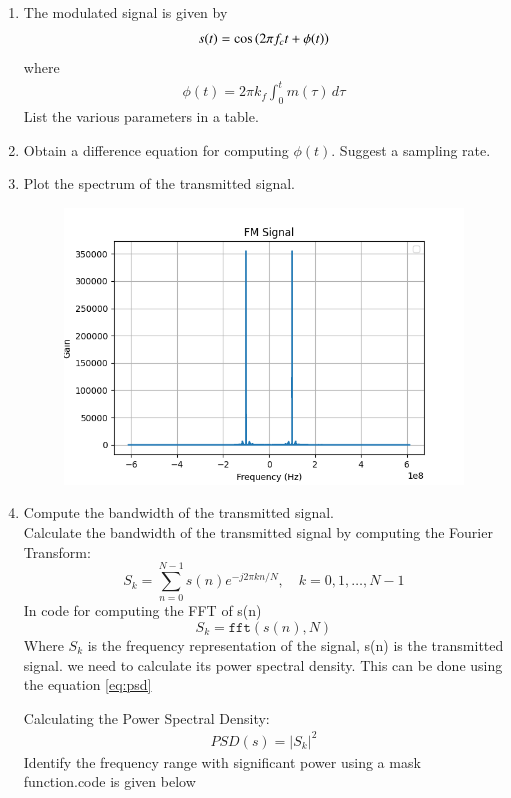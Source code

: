 \begin{enumerate}[label=\arabic*.,ref=\thesection.\theenumi]
\item The modulated signal is given by 
\begin{align}
	s(t) = \cos\left(2\pi f_c t + \phi(t)\right)
\end{align}
where
\begin{align}
	\phi(t) = 2\pi k_f \int_{0}^{t}m(\tau)\,d\tau
\end{align}
List the various parameters in a table.
\\
\solution 
\item Obtain a difference equation for computing $\phi(t)$.  Suggest a sampling rate.
\item Plot the spectrum of the transmitted signal.
\\
\begin{figure}[h]
\includegraphics[scale=0.7]{fm/tx/fm.png} 
\end{figure}

\item Compute the bandwidth of the transmitted signal.
\\
\solution Calculate the bandwidth of the transmitted signal by computing the Fourier Transform:
\begin{equation}
S_k = \sum_{n=0}^{N-1} s(n) e^{-j2\pi kn/N}, \quad k=0,1,\dots,N-1
\end{equation}
In code for computing the FFT of s(n)
\begin{equation}
S_k = \texttt{fft}(s(n), N)
\end{equation}
Where $S_k$ is the frequency representation of the signal, s(n) is the transmitted signal. 
we need to calculate its power spectral density. This can be done using the equation \eqref{eq:psd}

Calculating the Power Spectral Density: 
\begin{align}
PSD(s)=\lvert S_k \rvert^2 
\label{eq:psd}
\end{align}
Identify the frequency range with significant power using a mask function.code is given below\\
\begin{center}
\end{center}
\end{enumerate}
